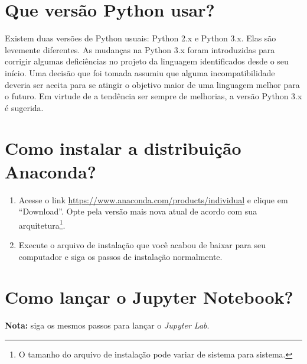 \documentclass[a4paper,12pt]{article}
\begin{document}
\section*{Que versão Python usar?}

Existem duas versões de Python usuais: Python 2.x e Python 3.x. Elas são
levemente diferentes. As mudanças na Python 3.x foram introduzidas para
corrigir algumas deficiências no projeto da linguagem identificados
desde o seu início. Uma decisão que foi tomada assumiu que alguma
incompatibilidade deveria ser aceita para se atingir o objetivo maior de
uma linguagem melhor para o futuro. Em virtude de a tendência ser sempre
de melhorias, a versão Python 3.x é sugerida.

\section*{Como instalar a distribuição Anaconda?}

\begin{enumerate}
\item
  Acesse o link \url{https://www.anaconda.com/products/individual} e clique em
  ``Download''. Opte pela versão mais nova atual de acordo com sua arquitetura\footnote{O tamanho do arquivo de instalação pode variar de sistema para sistema.}.
\item
  Execute o arquivo de instalação que você acabou de baixar para seu
  computador e siga os passos de instalação normalmente.
\end{enumerate}

\section*{Como lançar o Jupyter Notebook?}

\textbf{Nota:} siga os mesmos passos para lançar o \emph{Jupyter Lab}.
\end{document}
